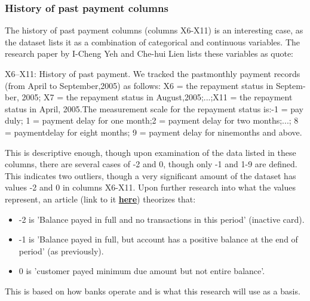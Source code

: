         \subsubsection{History of past payment columns}
            The history of past payment columns (columns X6-X11) is an interesting case, as the dataset lists it as a combination of categorical and continuous variables. The research paper by I-Cheng Yeh and Che-hui Lien \cite{CCdata} lists these variables as quote:
            \begin{displayquote}
                X6–X11: History of past payment. We tracked the pastmonthly payment records (from April to September,2005) as follows: X6 = the repayment status in Septem-ber,  2005;  X7 = the  repayment  status  in  August,2005;...;X11 = the repayment status in April, 2005.The measurement scale for the repayment status is:-1 = pay duly; 1 = payment delay for one month;2 = payment delay for two months;...; 8 = paymentdelay for eight months; 9 = payment delay for ninemonths and above.
            \end{displayquote}
            This is descriptive enough, though upon examination of the data listed in these columns, there are several cases of -2 and 0, though only -1 and 1-9 are defined. This indicates two outliers, though a very significant amount of the dataset has values -2 and 0 in columns X6-X11. Upon further research into what the values represent, an article (link to it \href{http://inseaddataanalytics.github.io/INSEADAnalytics/CourseSessions/ClassificationProcessCreditCardDefault.html}{\textbf{here}}) theorizes that\cite{1}:
            \begin{itemize}
                \item -2 is 'Balance payed in full and no transactions in this period' (inactive card).
                \item -1 is 'Balance payed in full, but account has a positive balance at the end of period' (as previously).
                \item 0 is 'customer payed minimum due amount but not entire balance'.
            \end{itemize}
            This is based on how banks operate and is what this research will use as a basis.\\\\
    
